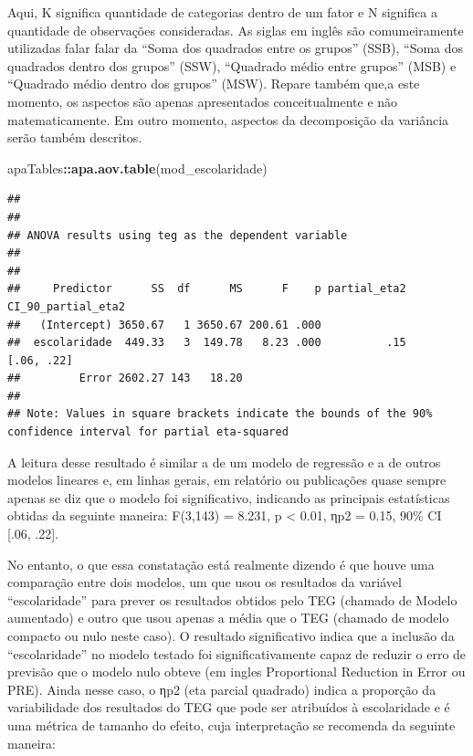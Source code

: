 \documentclass[
]{book}
\newenvironment{Shaded}{\begin{snugshade}}{\end{snugshade}}
\newcommand{\KeywordTok}[1]{\textcolor[rgb]{0.13,0.29,0.53}{\textbf{#1}}}
\newcommand{\NormalTok}[1]{#1}
\newcommand{\OperatorTok}[1]{\textcolor[rgb]{0.81,0.36,0.00}{\textbf{#1}}}
\begin{document}
Aqui, K significa quantidade de categorias dentro de um fator e N significa a quantidade de observações consideradas. As siglas em inglês são comumeiramente utilizadas falar falar da ``Soma dos quadrados entre os grupos'' (SSB), ``Soma dos quadrados dentro dos grupos'' (SSW), ``Quadrado médio entre grupos'' (MSB) e ``Quadrado médio dentro dos grupos'' (MSW). Repare também que,a este momento, os aspectos são apenas apresentados conceitualmente e não matematicamente. Em outro momento, aspectos da decomposição da variância serão também descritos.

\begin{Shaded}
\begin{Highlighting}[]
\NormalTok{apaTables}\OperatorTok{::}\KeywordTok{apa.aov.table}\NormalTok{(mod_escolaridade)}
\end{Highlighting}
\end{Shaded}

\begin{verbatim}
## 
## 
## ANOVA results using teg as the dependent variable
##  
## 
##     Predictor      SS  df      MS      F    p partial_eta2 CI_90_partial_eta2
##   (Intercept) 3650.67   1 3650.67 200.61 .000                                
##  escolaridade  449.33   3  149.78   8.23 .000          .15         [.06, .22]
##         Error 2602.27 143   18.20                                            
## 
## Note: Values in square brackets indicate the bounds of the 90% confidence interval for partial eta-squared
\end{verbatim}

A leitura desse resultado é similar a de um modelo de regressão e a de outros modelos lineares e, em linhas gerais, em relatório ou publicações quase sempre apenas se diz que o modelo foi significativo, indicando as principais estatísticas obtidas da seguinte maneira: F(3,143) = 8.231, p \textless{} 0.01, ηp2 = 0.15, 90\% CI {[}.06, .22{]}.

No entanto, o que essa constatação está realmente dizendo é que houve uma comparação entre dois modelos, um que usou os resultados da variável ``escolaridade'' para prever os resultados obtidos pelo TEG (chamado de Modelo aumentado) e outro que usou apenas a média que o TEG (chamado de modelo compacto ou nulo neste caso). O resultado significativo indica que a inclusão da ``escolaridade'' no modelo testado foi significativamente capaz de reduzir o erro de previsão que o modelo nulo obteve (em ingles Proportional Reduction in Error ou PRE). Ainda nesse caso, o ηp2 (eta parcial quadrado) indica a proporção da variabilidade dos resultados do TEG que pode ser atribuídos à escolaridade e é uma métrica de tamanho do efeito, cuja interpretação se recomenda da seguinte maneira:
\end{document}
